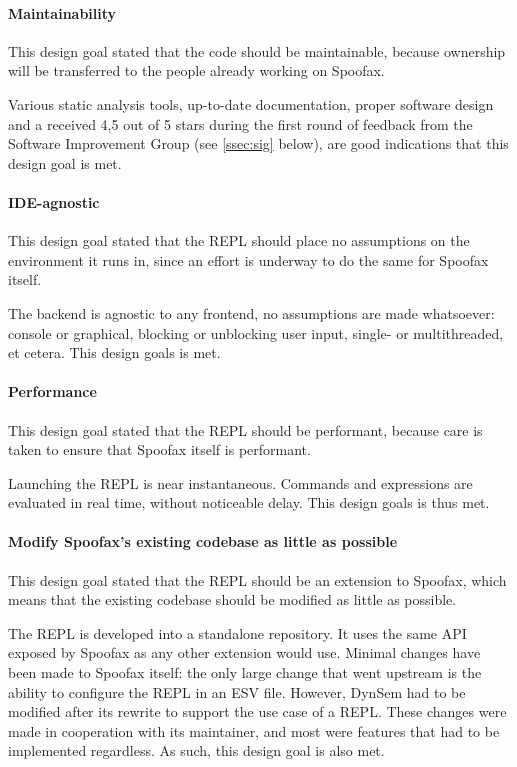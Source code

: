 \paragraph{Maintainability} This design goal stated that the code should be
maintainable, because ownership will be transferred to the people already
working on Spoofax.

Various static analysis tools, up-to-date documentation, proper software design
and a received 4,5 out of 5 stars during the first round of feedback from the
Software Improvement Group (see \cref{ssec:sig} below), are good indications that
this design goal is met.

\paragraph{IDE-agnostic} This design goal stated that the REPL should place no
assumptions on the environment it runs in, since an effort is underway to do the
same for Spoofax itself.

The backend is agnostic to any frontend, no assumptions are made whatsoever:
console or graphical, blocking or unblocking user input, single- or
multithreaded, et cetera. This design goals is met.

\paragraph{Performance} This design goal stated that the REPL should be
performant, because care is taken to ensure that Spoofax itself is performant.

Launching the REPL is near instantaneous. Commands and expressions are evaluated
in real time, without noticeable delay. This design goals is thus met.

\paragraph{Modify Spoofax's existing codebase as little as possible} This design
goal stated that the REPL should be an extension to Spoofax, which means that
the existing codebase should be modified as little as possible.

The REPL is developed into a standalone repository. It uses the same API exposed
by Spoofax as any other extension would use. Minimal changes have been made to
Spoofax itself: the only large change that went upstream is the ability to
configure the REPL in an ESV file. However, DynSem had to be 
modified after its rewrite to support the use case of a REPL. These changes were
made in cooperation with its maintainer, and most were features that had to be
implemented regardless. As such, this design goal is also met.

